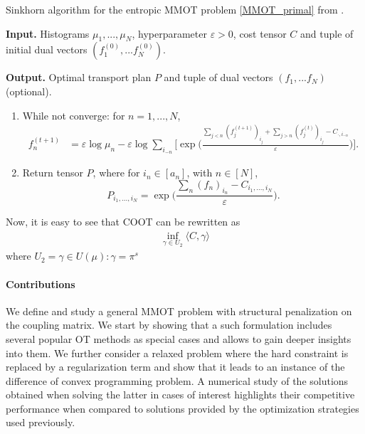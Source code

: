 \begin{algorithm}[h]
  \caption{Sinkhorn algorithm for the entropic MMOT problem \ref{MMOT_primal} from \citep{Benamou14}.}
  \textbf{Input.} Histograms $\mu_1,...,\mu_N$, hyperparameter $\varepsilon > 0$, cost tensor $C$ and
  tuple of initial dual vectors $(f^{(0)}_1, ... f^{(0)}_N)$.

  \textbf{Output.} Optimal transport plan $P$ and tuple of dual vectors $(f_1, ... f_N)$ (optional).
  \begin{enumerate}
    \item While not converge: for $n = 1, ..., N$,
    \begin{equation}
      \begin{split}
        f^{(t+1)}_n &= \varepsilon \log \mu_n - \varepsilon \log \sum_{i_{-n}}
        \Big[ \exp\Big( \frac{\sum_{j < n} (f^{(t+1)}_j)_{i_j} + \sum_{j > n} (f^{(t)}_j)_{i_j} -
        C_{\cdot, i_{-n}}}{\varepsilon} \Big) \Big].
      \end{split}
    \end{equation}
    \item Return tensor $P$, where for $i_n \in [a_n]$, with $n \in [N]$,
    \begin{equation}
      P_{i_1,...,i_N} = \exp\Big( \frac{\sum_n (f_n)_{i_n} - C_{i_1,...,i_N}}{\varepsilon} \Big).
    \end{equation}
  \end{enumerate}
  \label{algo:dual_mmot}
\end{algorithm}

Now, it is easy to see that COOT can be rewritten as
\begin{align}
  \inf_{\gamma \in U_2} \langle C, \gamma \rangle
\end{align}
where $U_2 = {\gamma \in U(\mu): \gamma = \pi^s }$

\paragraph{Contributions} We define and study a general MMOT problem with structural penalization on the coupling matrix.
We start by showing that a such formulation includes several popular OT methods as special cases and allows to gain deeper insights
into them. We further consider a relaxed problem where the hard constraint is replaced by a regularization term and show that it leads
to an instance of the difference of convex programming problem. A numerical study of the solutions obtained when solving the latter
in cases of interest highlights their competitive performance when compared to solutions provided by the optimization
strategies used previously.

